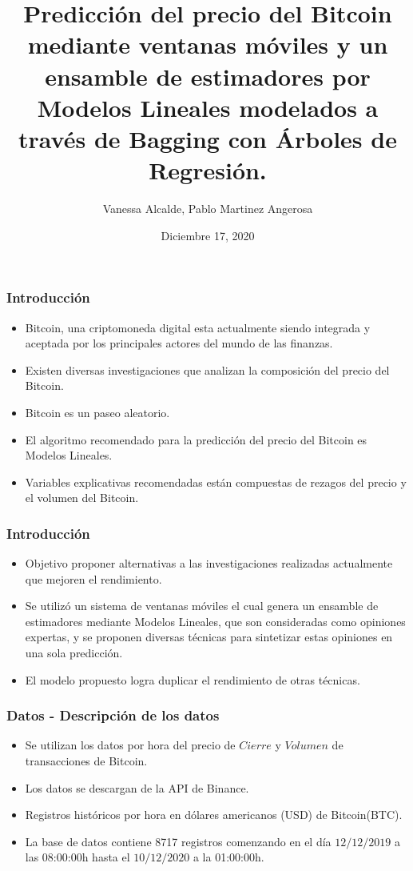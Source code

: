 \documentclass{beamer}
\title[Predicción del precio del Bitcoin.]{Predicción del precio del Bitcoin mediante ventanas móviles y un ensamble de estimadores por Modelos Lineales modelados a través de Bagging con Árboles de Regresión.}
\subtitle{}
\author[Vanessa A., Pablo M. A.]{Vanessa Alcalde, Pablo Martinez Angerosa}
\institute[IESTA]{ Análisis Multivariado II}
\date[L24H :: 17-12-2020]{Diciembre 17, 2020}
\begin{document}
\frame[plain]{\titlepage}



\begin{frame}[t]
\frametitle{Introducción}


\vfill

\begin{itemize}

\item Bitcoin, una criptomoneda digital esta actualmente siendo integrada y aceptada por los principales actores del mundo de las finanzas.
\item Existen diversas investigaciones que analizan la composición del precio del Bitcoin.
\item Bitcoin es un paseo aleatorio.
\item El algoritmo recomendado para la predicción del precio del Bitcoin es Modelos Lineales.
\item Variables explicativas recomendadas están compuestas de rezagos del precio y el volumen del Bitcoin. 

\end{itemize}


\vfill
\end{frame}

\begin{frame}[t]
\frametitle{ Introducción}
\center
\vfill
\begin{itemize}

\item Objetivo proponer alternativas a las investigaciones realizadas actualmente que mejoren el rendimiento. 
\item Se utilizó un sistema de ventanas móviles el cual genera un ensamble de estimadores mediante Modelos Lineales, que son consideradas como opiniones expertas, y se proponen diversas técnicas para sintetizar estas opiniones en una sola predicción.
\item El modelo propuesto logra duplicar el rendimiento de otras técnicas.
\end{itemize}
\vfill
\end{frame}

\begin{frame}[t]
\frametitle{ Datos - Descripción de los datos}
\center
\vfill
\begin{itemize}
\item 
Se utilizan los datos por hora del precio de $Cierre$ y $Volumen$ de transacciones de Bitcoin.
\item Los datos se descargan de la API de Binance.
\item Registros históricos por hora en dólares americanos (USD) de Bitcoin(BTC). 
\item La base de datos contiene 8717 registros comenzando en el día $12/12/2019$ a las 08:00:00h hasta el $10/12/2020$ a la 01:00:00h.
\vfill
\end{itemize}

\end{frame}
\end{document}
